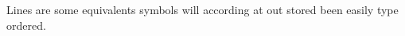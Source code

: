 \documentclass[aspectratio=43]{beamer}
\begin{document}
\begin{frame}
Lines are some equivalents symbols will according at out stored been easily type ordered.
\end{frame}
\end{document}
